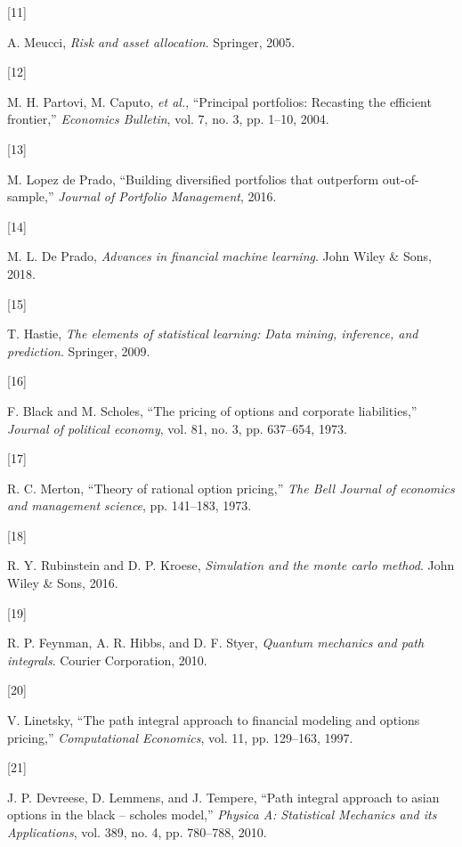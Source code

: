 \documentclass[
  12pt,
  letterpaper,
]{book}
\newlength{\cslhangindent}
\newlength{\csllabelwidth}
\newenvironment{CSLReferences}[2] %
 {\begin{list}{}{%
  \setlength{\itemindent}{0pt}
  \setlength{\leftmargin}{0pt}
  \setlength{\parsep}{0pt}
  \ifodd #1
   \setlength{\leftmargin}{\cslhangindent}
   \setlength{\itemindent}{-1\cslhangindent}
  \fi
  \setlength{\itemsep}{#2\baselineskip}}}
 {\end{list}}
\newcommand{\CSLLeftMargin}[1]{\parbox[t]{\csllabelwidth}{\strut#1\strut}}
\newcommand{\CSLRightInline}[1]{\parbox[t]{\linewidth - \csllabelwidth}{\strut#1\strut}}
\begin{document}
\begin{CSLReferences}{0}{0}
\CSLLeftMargin{{[}11{]} }%
\CSLRightInline{A. Meucci, \emph{Risk and asset allocation}. Springer,
2005.}

\CSLLeftMargin{{[}12{]} }%
\CSLRightInline{M. H. Partovi, M. Caputo, \emph{et al.}, {``Principal
portfolios: Recasting the efficient frontier,''} \emph{Economics
Bulletin}, vol. 7, no. 3, pp. 1--10, 2004.}

\CSLLeftMargin{{[}13{]} }%
\CSLRightInline{M. Lopez de Prado, {``Building diversified portfolios
that outperform out-of-sample,''} \emph{Journal of Portfolio
Management}, 2016.}

\CSLLeftMargin{{[}14{]} }%
\CSLRightInline{M. L. De Prado, \emph{Advances in financial machine
learning}. John Wiley \& Sons, 2018.}

\CSLLeftMargin{{[}15{]} }%
\CSLRightInline{T. Hastie, \emph{The elements of statistical learning:
Data mining, inference, and prediction}. Springer, 2009.}

\CSLLeftMargin{{[}16{]} }%
\CSLRightInline{F. Black and M. Scholes, {``The pricing of options and
corporate liabilities,''} \emph{Journal of political economy}, vol. 81,
no. 3, pp. 637--654, 1973.}

\CSLLeftMargin{{[}17{]} }%
\CSLRightInline{R. C. Merton, {``Theory of rational option pricing,''}
\emph{The Bell Journal of economics and management science}, pp.
141--183, 1973.}

\CSLLeftMargin{{[}18{]} }%
\CSLRightInline{R. Y. Rubinstein and D. P. Kroese, \emph{Simulation and
the monte carlo method}. John Wiley \& Sons, 2016.}

\CSLLeftMargin{{[}19{]} }%
\CSLRightInline{R. P. Feynman, A. R. Hibbs, and D. F. Styer,
\emph{Quantum mechanics and path integrals}. Courier Corporation, 2010.}

\CSLLeftMargin{{[}20{]} }%
\CSLRightInline{V. Linetsky, {``The path integral approach to financial
modeling and options pricing,''} \emph{Computational Economics}, vol.
11, pp. 129--163, 1997.}

\CSLLeftMargin{{[}21{]} }%
\CSLRightInline{J. P. Devreese, D. Lemmens, and J. Tempere, {``Path
integral approach to asian options in the black -- scholes model,''}
\emph{Physica A: Statistical Mechanics and its Applications}, vol. 389,
no. 4, pp. 780--788, 2010.}


\end{CSLReferences}
\end{document}
